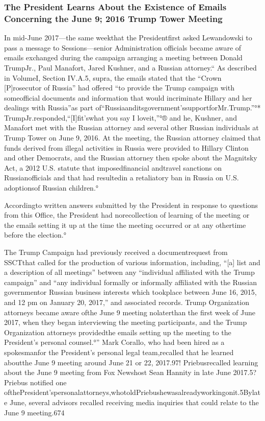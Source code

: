 \subsubsection{The President Learns About the Existence of Emails Concerning the June 9; 2016 Trump Tower Meeting}

In mid-June 2017—the same weekthat the Presidentfirst asked Lewandowski to pass a message to Sessions—senior Administration officials became aware of emails exchanged during the campaign arranging a meeting between Donald TrumpJr., Paul Manafort, Jared Kushner, and a Russian attorney.“ As described in VolumeI, Section IV.A.5, supra, the emails stated that the “Crown [P]rosecutor of Russia” had offered “to provide the Trump campaign with someofficial documents and information that would incriminate Hillary and her dealings with Russia”as part of“Russiaanditsgovernment’ssupportforMr.Trump.”°* TrumpJr.responded,“[I]fit’swhat you say I loveit,”°® and he, Kushner, and Manafort met with the Russian attorney and several other Russian individuals at Trump Tower on June 9, 2016.%
At the meeting, the Russian attorney claimed that funds derived from illegal activities in Russia were provided to Hillary Clinton and other Democrats, and the Russian attorney then spoke about the Magnitsky Act, a 2012 U.S. statute that imposedfinancial andtravel sanctions on Russianofficials and that had resultedin a retaliatory ban in Russia on U.S. adoptionsof Russian children.°

Accordingto written answers submitted by the President in response to questions from this Office, the President had norecollection of learning of the meeting or the emails setting it up at the time the meeting occurred or at any othertime before the election.°

The Trump Campaign had previously received a documentrequest from SSCTthat called for the production of various information, including, “[a] list and a description of all meetings” between any “individual affiliated with the Trump campaign” and “any individual formally or informally affiliated with the Russian governmentor Russian business interests which tookplace between June 16, 2015, and 12 pm on January 20, 2017,” and associated records.%
Trump Organization attorneys became aware ofthe June 9 meeting nolaterthan the first week of June 2017, when they began interviewing the meeting participants, and the Trump Organization attorneys providedthe emails setting up the meeting to the President’s personal counsel.°” Mark Corallo, who had been hired as a spokesmanfor the President’s personal legal team,recalled that he learned aboutthe June 9 meeting around June 21 or 22, 2017.97! Priebusrecalled learning about the June 9 meeting from Fox Newshost Sean Hannity in late June 2017.5? Priebus notified one ofthePresident’spersonalattorneys,whotoldPriebushewasalreadyworkingonit.5Bylate June, several advisors recalled receiving media inquiries that could relate to the June 9 meeting.674

